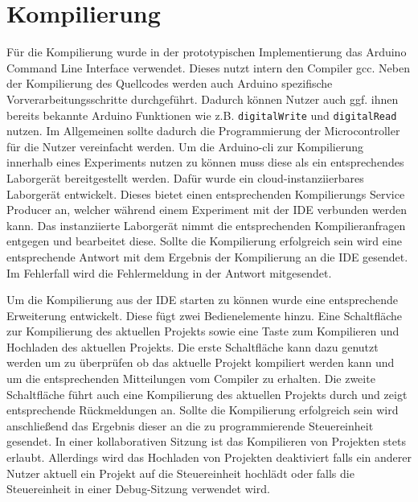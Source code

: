 \section{Kompilierung}\label{section:prototypische-implementierung:kompilierung}

Für die Kompilierung wurde in der prototypischen Implementierung das Arduino Command Line Interface  verwendet. Dieses nutzt intern den Compiler gcc. Neben der Kompilierung des Quellcodes werden auch Arduino spezifische Vorverarbeitungsschritte durchgeführt. Dadurch können Nutzer auch ggf. ihnen bereits bekannte Arduino Funktionen wie z.B. \texttt{digitalWrite} und \texttt{digitalRead} nutzen. Im Allgemeinen sollte dadurch die Programmierung der Microcontroller für die Nutzer vereinfacht werden. Um die Arduino-cli zur Kompilierung innerhalb eines Experiments nutzen zu können muss diese als ein entsprechendes Laborgerät bereitgestellt werden. Dafür wurde ein cloud-instanziierbares Laborgerät entwickelt. Dieses bietet einen entsprechenden Kompilierungs Service Producer an, welcher während einem Experiment mit der IDE verbunden werden kann. Das instanziierte Laborgerät nimmt die entsprechenden Kompilieranfragen entgegen und bearbeitet diese. Sollte die Kompilierung erfolgreich sein wird eine entsprechende Antwort mit dem Ergebnis der Kompilierung an die IDE gesendet. Im Fehlerfall wird die Fehlermeldung in der Antwort mitgesendet.

Um die Kompilierung aus der IDE starten zu können wurde eine entsprechende Erweiterung entwickelt. Diese fügt zwei Bedienelemente hinzu. Eine Schaltfläche zur Kompilierung des aktuellen Projekts sowie eine Taste zum Kompilieren und Hochladen des aktuellen Projekts. Die erste Schaltfläche kann dazu genutzt werden um zu überprüfen ob das aktuelle Projekt kompiliert werden kann und um die entsprechenden Mitteilungen vom Compiler zu erhalten. Die zweite Schaltfläche führt auch eine Kompilierung des aktuellen Projekts durch und zeigt entsprechende Rückmeldungen an. Sollte die Kompilierung erfolgreich sein wird anschließend das Ergebnis dieser an die zu programmierende Steuereinheit gesendet. In einer kollaborativen Sitzung ist das Kompilieren von Projekten stets erlaubt. Allerdings wird das Hochladen von Projekten deaktiviert falls ein anderer Nutzer aktuell ein Projekt auf die Steuereinheit hochlädt oder falls die Steuereinheit in einer Debug-Sitzung verwendet wird.